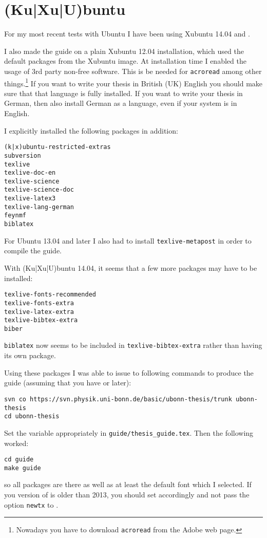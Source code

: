 \section{(Ku|Xu|U)buntu}
\label{sec:app:kubuntu}

For my most recent tests with Ubuntu I have been using Xubuntu 14.04 and 
.

I also made the guide on a plain Xubuntu 12.04
installation, which used the default packages from the Xubuntu image. At
installation time I enabled the usage of 3rd party non-free
software. This is be needed for \texttt{acroread} among other
things.\footnote{Nowadays you have to download \texttt{acroread} from
  the Adobe web page.} 
If you want to write your thesis in British (UK) English you should make sure
that that language is fully installed. If you want to write your
thesis in German, then also install German as a language, even if
your system is in English.

I explicitly installed the following packages in addition:
\begin{verbatim}
(k|x)ubuntu-restricted-extras
subversion
texlive
texlive-doc-en
texlive-science
texlive-science-doc
texlive-latex3
texlive-lang-german
feynmf
biblatex
\end{verbatim}
For Ubuntu 13.04 and later I also had to install \texttt{texlive-metapost} in
order to compile the guide.

With (Ku|Xu|U)buntu 14.04, it seems that a few more packages may have to be installed:
\begin{verbatim}
texlive-fonts-recommended
texlive-fonts-extra
texlive-latex-extra
texlive-bibtex-extra
biber
\end{verbatim}
\texttt{biblatex} now seems to be included in \texttt{texlive-bibtex-extra} rather than having its own package.

\noindent
Using these packages I was able to issue to following commands to
produce the guide (assuming that you have  or later):
\begin{verbatim}
svn co https://svn.physik.uni-bonn.de/basic/ubonn-thesis/trunk ubonn-thesis
cd ubonn-thesis
\end{verbatim}
Set the  variable appropriately in \texttt{guide/thesis\_guide.tex}.
Then the following worked:
\begin{verbatim}
cd guide
make guide
\end{verbatim}
so all packages are there as well as at least the default font which I
selected. If you version of \TeXLive is older than 2013, you should set
 accordingly and not pass the option \texttt{newtx} to .

